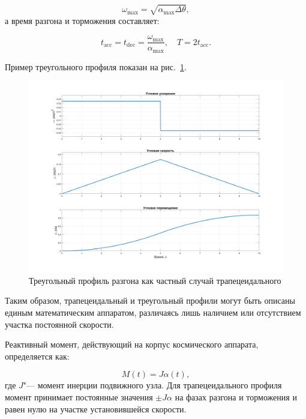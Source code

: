 \begin{equation}
	\omega_{\mathrm{max}} = \sqrt{\alpha_{\max}  \Delta \theta},
\end{equation}
а время разгона и торможения составляет:

\begin{equation}
	t_{\mathrm{acc}} = t_{\mathrm{dec}} = \frac{\omega_{\mathrm{max}}}{\alpha_{\max}}, \quad T = 2t_{\mathrm{acc}}.
\end{equation}


Пример треугольного профиля показан на рис.~\ref{fig:triangle_profile}.

\begin{figure}[h!]
	\centering
	\includegraphics[scale=0.3]{matlab/img/triangle-profile.png}
	\caption{Треугольный профиль разгона как частный случай трапецеидального}
	\label{fig:triangle_profile}
\end{figure}

Таким образом, трапецеидальный и треугольный профили могут быть описаны единым математическим аппаратом, различаясь лишь наличием или отсутствием участка постоянной скорости.

Реактивный момент, действующий на корпус космического аппарата, определяется как:

\begin{equation}
	M(t) = J \alpha(t),
\end{equation}
где \(J\)"--- момент инерции подвижного узла.
Для трапецеидального профиля момент принимает постоянные значения $\pm J \alpha$ на фазах разгона и торможения и равен нулю на участке установившейся скорости. 


